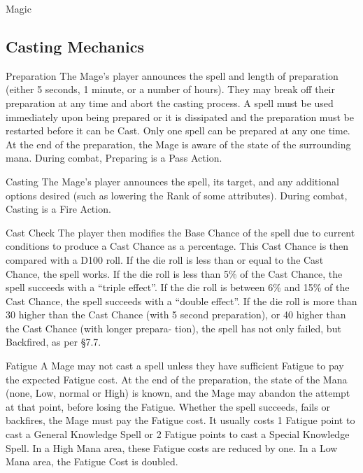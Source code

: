 \begin{Chapter}{Magic}
\subsection{Casting Mechanics}

\begin{Description}

\item[Preparation] The Mage’s player announces the spell and length of
  preparation (either 5 seconds, 1 minute, or a number of hours). They
  may break off their preparation at any time and abort the casting
  process.  A spell must be used immediately upon being prepared or it
  is dissipated and the preparation must be restarted before it can be
  Cast.  Only one spell can be prepared at any one time.  At the end
  of the preparation, the Mage is aware of the state of the
  surrounding mana.  During combat, Preparing is a Pass Action.

\item[Casting] The Mage’s player announces the spell, its target, and
  any additional options desired (such as lowering the Rank of some
  attributes).  During combat, Casting is a Fire Action.

\item[Cast Check] The player then modifies the Base Chance of the
  spell due to current conditions to produce a Cast Chance as a
  percentage.  This Cast Chance is then compared with a D100 roll.  If
  the die roll is less than or equal to the Cast Chance, the spell
  works.  If the die roll is less than 5\% of the Cast Chance, the
  spell succeeds with a “triple effect”.  If the die roll is between
  6\% and 15\% of the Cast Chance, the spell succeeds with a “double
  effect”.  If the die roll is more than 30 higher than the Cast
  Chance (with 5 second preparation), or 40 higher than the Cast
  Chance (with longer prepara- tion), the spell has not only failed,
  but Backfired, as per §7.7.

\item[Fatigue] A Mage may not cast a spell unless they have sufficient
  Fatigue to pay the expected Fatigue cost. At the end of the
  preparation, the state of the Mana (none, Low, normal or High) is
  known, and the Mage may abandon the attempt at that point, before
  losing the Fatigue.  Whether the spell succeeds, fails or backfires,
  the Mage must pay the Fatigue cost. It usually costs 1 Fatigue point
  to cast a General Knowledge Spell or 2 Fatigue points to cast a
  Special Knowledge Spell.  In a High Mana area, these Fatigue costs
  are reduced by one.  In a Low Mana area, the Fatigue Cost is
  doubled.


\end{Description}
\end{Chapter}
